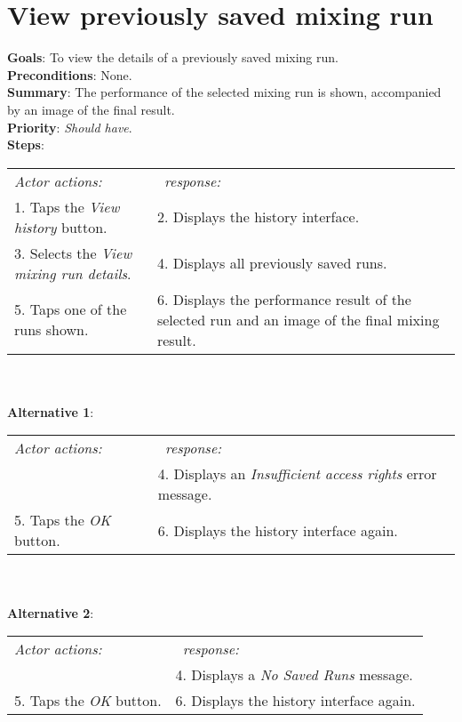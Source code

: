 \section{View previously saved mixing run}
  \label{mixhist}
  \textbf{Goals}: To view the details of a previously saved mixing run.\\
  \textbf{Preconditions}: None.\\
  \textbf{Summary}: The performance of the selected mixing run is shown, accompanied by an image of the final result.\\
  \textbf{Priority}: \emph{Should have}.\\
  \textbf{Steps}: \\
    \begin{tabular}{ p{} p{} }
  	\emph{Actor actions:} & \emph{\projectname\ response:} \\
    1. Taps the \emph{View history} button. & 2. Displays the history interface.\\
    3. Selects the \emph{View mixing run details}. & 4. Displays all previously saved runs.\\
    5. Taps one of the runs shown. & 6. Displays the performance result of the selected run and an image of the final mixing result. \\
    \end{tabular}
    \\
     \\\textbf{Alternative 1}: \\
    \begin{tabular}{ p{} p{} }
  	\emph{Actor actions:} & \emph{\projectname\ response:} \\
            & 4. Displays an \emph{Insufficient access rights} error message. \\
    5. Taps the \emph{OK} button. & 6. Displays the history interface again. \\
    \end{tabular}
        \\
     \\\textbf{Alternative 2}: \\
    \begin{tabular}{ p{} p{} }
  	\emph{Actor actions:} & \emph{\projectname\ response:} \\
            & 4. Displays a \emph{No Saved Runs} message. \\
    5. Taps the \emph{OK} button. & 6. Displays the history interface again. \\
    \end{tabular}

